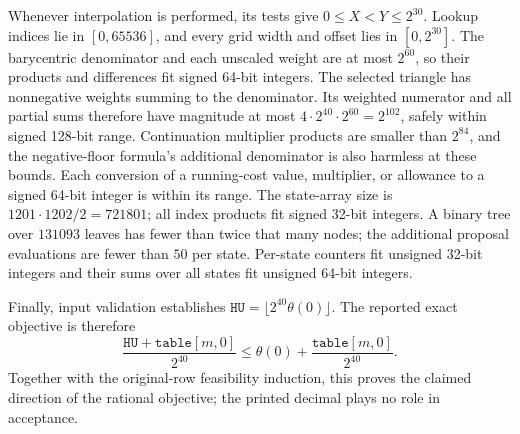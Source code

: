 Whenever interpolation is performed, its tests give
$0\le X<Y\le2^{30}$.  Lookup indices lie in $[0,65536]$, and every
grid width and offset lies in $[0,2^{30}]$.  The barycentric denominator
and each unscaled weight are at most $2^{60}$, so their products and
differences fit signed 64-bit integers.  The selected triangle has
nonnegative weights summing to the denominator.  Its weighted numerator
and all partial sums therefore have magnitude at most
$4\cdot2^{40}\cdot2^{60}=2^{102}$, safely within signed 128-bit range.
Continuation multiplier products are smaller than $2^{84}$, and the
negative-floor formula's additional denominator is also harmless at
these bounds.  Each conversion of a running-cost value, multiplier, or
allowance to a signed 64-bit integer is within its range.
The state-array size is $1201\cdot1202/2=721801$; all index products fit
signed 32-bit integers.  A binary tree over $131093$ leaves has fewer
than twice that many nodes; the additional proposal evaluations are
fewer than $50$ per state.  Per-state counters fit unsigned 32-bit
integers and their sums over all states fit unsigned 64-bit integers.

Finally, input validation establishes
$\texttt{HU}=\lfloor2^{40}\theta(0)\rfloor$.
The reported exact objective is therefore
\[
 \frac{\texttt{HU}+\texttt{table}[m,0]}{2^{40}}
 \le\theta(0)+\frac{\texttt{table}[m,0]}{2^{40}}.
\]
Together with the original-row feasibility induction, this proves the
claimed direction of the rational objective; the printed decimal plays
no role in acceptance.
